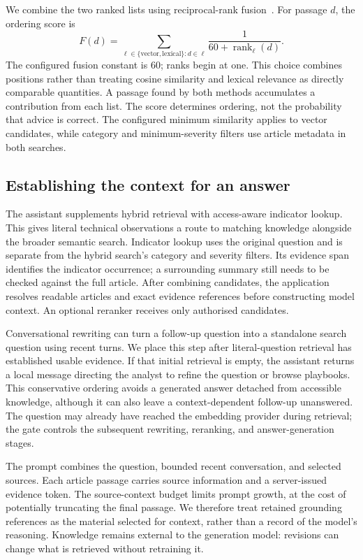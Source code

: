We combine the two ranked lists using reciprocal-rank fusion~\cite{cormack2009rrf}. For passage $d$, the ordering score is
\begin{equation}
 F(d)=\sum_{\ell\in\{\mathrm{vector},\mathrm{lexical}\}:d\in\ell}
 \frac{1}{60+\operatorname{rank}_{\ell}(d)}.
\end{equation}
The configured fusion constant is 60; ranks begin at one. This choice combines positions rather than treating cosine similarity and lexical relevance as directly comparable quantities. A passage found by both methods accumulates a contribution from each list. The score determines ordering, not the probability that advice is correct. The configured minimum similarity applies to vector candidates, while category and minimum-severity filters use article metadata in both searches.

\subsection{Establishing the context for an answer}

The assistant supplements hybrid retrieval with access-aware indicator lookup. This gives literal technical observations a route to matching knowledge alongside the broader semantic search. Indicator lookup uses the original question and is separate from the hybrid search's category and severity filters. Its evidence span identifies the indicator occurrence; a surrounding summary still needs to be checked against the full article. After combining candidates, the application resolves readable articles and exact evidence references before constructing model context. An optional reranker receives only authorised candidates.

Conversational rewriting can turn a follow-up question into a standalone search question using recent turns. We place this step after literal-question retrieval has established usable evidence. If that initial retrieval is empty, the assistant returns a local message directing the analyst to refine the question or browse playbooks. This conservative ordering avoids a generated answer detached from accessible knowledge, although it can also leave a context-dependent follow-up unanswered. The question may already have reached the embedding provider during retrieval; the gate controls the subsequent rewriting, reranking, and answer-generation stages.

The prompt combines the question, bounded recent conversation, and selected sources. Each article passage carries source information and a server-issued evidence token. The source-context budget limits prompt growth, at the cost of potentially truncating the final passage. We therefore treat retained grounding references as the material selected for context, rather than a record of the model's reasoning. Knowledge remains external to the generation model: revisions can change what is retrieved without retraining it.


